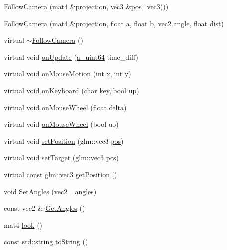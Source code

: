 \begin{DoxyCompactItemize}
\item 
\hyperlink{class_agmd_1_1_follow_camera_a8f2e873b4d1d046e1a15b472e6f6f2ea}{Follow\+Camera} (mat4 \&projection, vec3 \&\hyperlink{_examples_2_planet_2_app_8cpp_aa8a1c0491559faca4ebd0881575ae7f0}{pos}=vec3())
\item 
\hyperlink{class_agmd_1_1_follow_camera_afc8c65d1d89b6dbb8260abec3b3abbac}{Follow\+Camera} (mat4 \&projection, float a, float b, vec2 angle, float dist)
\item 
virtual \hyperlink{class_agmd_1_1_follow_camera_ad0758578f1cf325d7498296700b72e1d}{$\sim$\+Follow\+Camera} ()
\item 
virtual void \hyperlink{class_agmd_1_1_follow_camera_ab79070a449a69cb3efe591aa631cb908}{on\+Update} (\hyperlink{_common_defines_8h_a6c5192ec3c55d6e5b13d2dbaa082bdea}{a\+\_\+uint64} time\+\_\+diff)
\item 
virtual void \hyperlink{class_agmd_1_1_follow_camera_a3e1d519781c295ac1f42f462b769c9c5}{on\+Mouse\+Motion} (int x, int y)
\item 
virtual void \hyperlink{class_agmd_1_1_follow_camera_a3186556fa90cb4f9c49d59afe609f3dd}{on\+Keyboard} (char key, bool up)
\item 
virtual void \hyperlink{class_agmd_1_1_follow_camera_a235dd31d95e9363785c25660952c1b9b}{on\+Mouse\+Wheel} (float delta)
\item 
virtual void \hyperlink{class_agmd_1_1_follow_camera_ac4cc280147816950f48d2f375f51a65f}{on\+Mouse\+Wheel} (bool up)
\item 
virtual void \hyperlink{class_agmd_1_1_follow_camera_ad32b73bb67f8155d20978b7bbd8af536}{set\+Position} (glm\+::vec3 \hyperlink{_examples_2_planet_2_app_8cpp_aa8a1c0491559faca4ebd0881575ae7f0}{pos})
\item 
virtual void \hyperlink{class_agmd_1_1_follow_camera_ae67f0bb92c39993a01f3cdbbbdeffeb6}{set\+Target} (glm\+::vec3 \hyperlink{_examples_2_planet_2_app_8cpp_aa8a1c0491559faca4ebd0881575ae7f0}{pos})
\item 
virtual const glm\+::vec3 \hyperlink{class_agmd_1_1_follow_camera_a00844fc6f5c31935b3590c781d16f90c}{get\+Position} ()
\item 
void \hyperlink{class_agmd_1_1_follow_camera_a49778fef0864dba27545ad66491eeae7}{Set\+Angles} (vec2 \+\_\+angles)
\item 
const vec2 \& \hyperlink{class_agmd_1_1_follow_camera_aaaf5e69d63b0673842711333940c057d}{Get\+Angles} ()
\item 
mat4 \hyperlink{class_agmd_1_1_follow_camera_a5e5a5e8c8578dd7ee00d2139318d35b9}{look} ()
\item 
const std\+::string \hyperlink{class_agmd_1_1_follow_camera_a78d7380ca1be7ca3fd26447f32586a23}{to\+String} ()
\end{DoxyCompactItemize}
